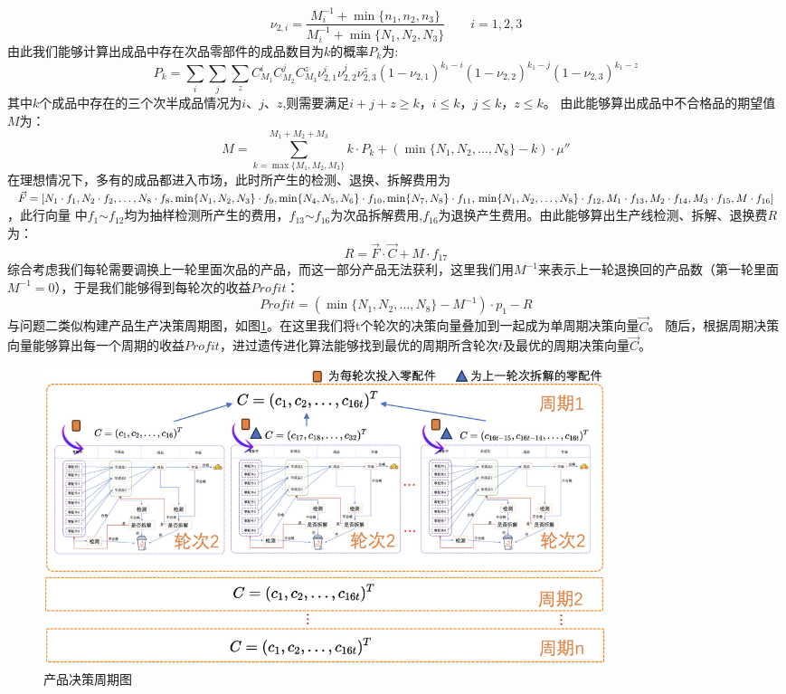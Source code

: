\documentclass[withoutpreface,bwprint]{cumcmthesis} %
\begin{document}
$$\nu_{2,i}=\frac{M_{i}^{-1}+\min \{ n_{1},n_{2},n_{3}\}}{M_{i}^{-1}+\min \{N_{1},N_{2},N_{3}\}}\qquad i=1,2,3$$
由此我们能够计算出成品中存在次品零部件的成品数目为$k$的概率$P_{k}$为:
\begin{equation}
	P_{k}=\sum_{i}\sum_{j}\sum_{z}C_{M_{1}}^{i}C_{M_{2}}^{j}C_{M_{3}}^{z}\nu_{2,1}^{i}\nu_{2,2}^{j}\nu_{2,3}^{z}(1-\nu_{2,1})^{k_{1}-i}(1-\nu_{2,2})^{k_{1}-j}(1-\nu_{2,3})^{k_{1}-z}
	\label{eq:9}
\end{equation}
其中$k$个成品中存在的三个次半成品情况为$i$、$j$、$z$,则需要满足$i+j+z \ge k$，$i\le k$，$j\le k$，$z\le k$。
由此能够算出成品中不合格品的期望值$M$为：
\begin{equation}
	M=\sum_{k=\max \{M_{1},M_{2},M_{3}\}}^{M_{1}+M_{2}+M_{3}}k\cdot P_{k}+(\min \{N_{1},N_{2},\dots,N_{8}\}-k)\cdot \mu''
	\label{eq:10}
\end{equation}
在理想情况下，多有的成品都进入市场，此时所产生的检测、退换、拆解费用为$\vec{F}=[N_{1}\cdot f_{1},N_{2}\cdot f_{2},\dots,N_{8}\cdot f_{8},
\min \{ N_{1},N_{2},N_{3}\}\cdot f_{9},\min \{ N_{4},N_{5},N_{6}\}\cdot f_{10},\min \{ N_{7},N_{8}\}\cdot f_{11},\\
\min \{N_{1},N_{2},\dots,N_{8}\}\cdot f_{12},M_{1}\cdot f_{13},M_{2}\cdot f_{14},M_{3}\cdot f_{15},M\cdot f_{16}]$，此行向量
中$f_{1}$$\sim$$f_{12}$均为抽样检测所产生的费用，$f_{13}$$\sim$$f_{16}$为次品拆解费用,$f_{16}$为退换产生费用。由此能够算出生产线检测、拆解、退换费$R$为：
\begin{equation}
	R=\vec{F}\cdot \vec{C} + M\cdot f_{17}
	\label{eq:11}
\end{equation}
综合考虑我们每轮需要调换上一轮里面次品的产品，而这一部分产品无法获利，这里我们用$M^{-1}$来表示上一轮退换回的产品数（第一轮里面$M^{-1}=0$），于是我们能够得到每轮次的收益$Profit$：
\begin{equation}
	\textit{Profit}=(\min \{N_{1},N_{2},\dots,N_{8}\}-M^{-1})\cdot p_{1}-R
	\label{eq:12}
\end{equation}
与问题二类似构建产品生产决策周期图，如图\ref{fig:pro3-2}。在这里我们将t个轮次的决策向量叠加到一起成为单周期决策向量$\vec{C}$。
随后，根据周期决策向量能够算出每一个周期的收益$Profit$，进过遗传进化算法能够找到最优的周期所含轮次$t$及最优的周期决策向量$\vec{C}$。
\begin{figure}[H]
	\centering
	\includegraphics[width=0.8\textwidth]{Fig/pro3-2.png}
	\caption{产品决策周期图}
	\label{fig:pro3-2}
\end{figure}
\end{document}
